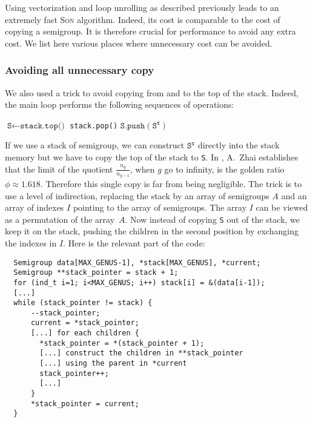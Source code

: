 \documentclass[reqno]{amsart}
\theoremstyle{plain}
\theoremstyle{definition}
\renewcommand{\tt}[1]{\texttt{#1}}
\begin{document}
Using vectorization and loop unrolling as described previously leads to an
extremely fast \textsc{Son} algorithm. Indeed, its cost is comparable to the cost
of copying a semigroup. It is therefore crucial for performance to avoid any
extra cost. We list here various places where unnecessary cost can be avoided.



\subsubsection*{Avoiding all unnecessary copy} We also used a trick to avoid
copying from and to the top of the stack. Indeed, the main loop performs the
following sequences of operations:

\vspace{1em}

{\small
\begin{algorithmic}
  \State $\tt{S} \gets \tt{stack.top()}$
  \State \tt{stack.pop()}
  \For{all children $\tt{S}^\tt{x}$ of \tt{S}}
  \State $\tt{S.push}(\tt{S}^\tt{x})$
  \EndFor
\end{algorithmic}
}

\vspace{0.5em}

If we use a stack of semigroup, we can construct $\tt{S}^\tt{x}$ directly into
the stack memory but we have to copy the top of the stack to \tt{S}. 
In \cite{Zhai}, A.~Zhai establishes that the limit of the quotient   $\frac{n_g}{n_{g-1}}$, when $g$ go to infinity, is the golden ratio $\phi\approx 1.618$. Therefore this single copy is far from
being negligible. The trick is to use a level of indirection, replacing the
stack by an array of semigroups $A$ and an array of indexes $I$ pointing to the array of
semigroups. The array $I$ can be viewed as a permutation of
the array~$A$. Now instead of copying \tt{S} out of the stack, we keep
it on the stack, pushing the children in the second position by exchanging the
indexes in $I$. Here is the relevant part of the code:

\vspace{0.5em}

{\small
\begin{verbatim}
  Semigroup data[MAX_GENUS-1], *stack[MAX_GENUS], *current;
  Semigroup **stack_pointer = stack + 1;
  for (ind_t i=1; i<MAX_GENUS; i++) stack[i] = &(data[i-1]);
  [...]
  while (stack_pointer != stack) {
      --stack_pointer;
      current = *stack_pointer;
      [...] for each children {
        *stack_pointer = *(stack_pointer + 1);
        [...] construct the children in **stack_pointer
        [...] using the parent in *current
        stack_pointer++;
        [...]
      }
      *stack_pointer = current;
  }
\end{verbatim}
}
\end{document}

